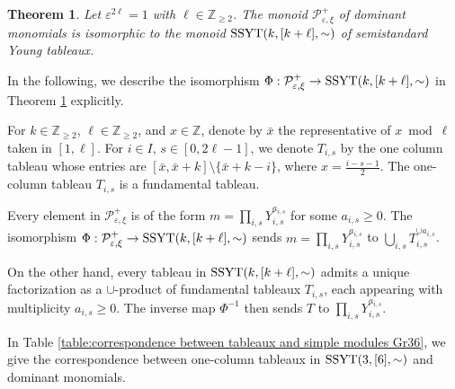 \documentclass[11pt, reqno]{amsart}
\theoremstyle{plain}
\newtheorem{theorem}{Theorem}[section]
\theoremstyle{definition}
\numberwithin{equation}{section}
\newcommand{\ZZ}{{\mathbb {Z}}}
\newcommand{\SSYT}{{\rm SSYT}}
\begin{document}
\begin{theorem}\label{thm: isomorphic tableaux}
Let $\varepsilon^{2 \ell}=1$ with $\ell \in \ZZ_{\geq 2}$. The monoid $\mathcal{P}^+_{\varepsilon, \xi}$ of dominant monomials is isomorphic to the monoid $\SSYT(k, [k+\ell], \sim)$ of semistandard Young tableaux.
\end{theorem}

In the following, we describe the isomorphism $\Phi: \mathcal{P}^+_{\varepsilon,\xi} \to \SSYT(k, [k+\ell], \sim)$ in Theorem \ref{thm: isomorphic tableaux} explicitly. 

For $k \in \mathbb{Z}_{\ge 2}$, $\ell \in \mathbb{Z}_{\ge 2}$, and $x \in \mathbb{Z}$, denote by $\bar{x}$ the representative of $x \bmod \ell$ taken in $[1,\ell]$. For $i \in I$, $s \in [0,2\ell-1]$, we denote $T_{i,s}$ by the one column tableau whose entries are $[\bar{x}, \bar{x}+k] \setminus \{\bar{x}+k-i\}$, where $x=\frac{i-s-1}{2}$. The one-column tableau $T_{i,s}$ is a fundamental tableau. 

Every element in $\mathcal{P}^+_{\varepsilon,\xi}$ is of the form $m = \prod_{i,s} Y_{i,s}^{a_{i,s}}$ for some $a_{i,s} \ge 0$. The isomorphism $\Phi: \mathcal{P}^+_{\varepsilon,\xi} \to \SSYT(k, [k+\ell], \sim)$ sends $m = \prod_{i,s} Y_{i,s}^{a_{i,s}}$ to $\bigcup_{i,s} T_{i,s}^{\cup a_{i,s}}$. 

On the other hand, every tableau in $\SSYT(k, [k+\ell], \sim)$ admits a unique factorization as a $\cup$-product of fundamental tableaux $T_{i,s}$, each appearing with multiplicity $a_{i,s} \ge 0$. The inverse map $\Phi^{-1}$ then sends $T$ to $\prod_{i,s} Y_{i,s}^{a_{i,s}}$.

In Table \ref{table:correspondence between tableaux and simple modules Gr36}, we give the correspondence between one-column tableaux in $\SSYT(3, [6], \sim)$ and dominant monomials. 
 
\end{document}
